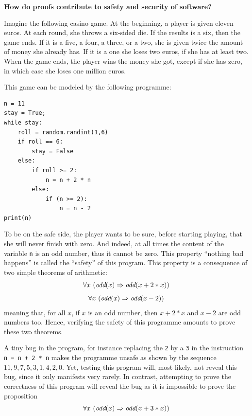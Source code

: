 \begin{shaded}
\vspace*{-0.5cm}
\begin{center}
{\bf \Large How do proofs contribute to safety and security of software?}
\end{center}

Imagine the following casino game. At the beginning, a player is given
eleven euros. At each round, she throws a six-sided die. If the
results is a six, then the game ends.  If it is a five, a four, a
three, or a two, she is given twice the amount of money she already
has. If it is a one she loses two euros, if she has at least two.
When the game ends, the player wins the money she got, except if she
has zero, in which case she loses one million euros.

This game can be modeled by the following programme:
\begin{center}
    \begin{minipage}{10cm}
\begin{verbatim}
n = 11
stay = True;
while stay:
    roll = random.randint(1,6)
    if roll == 6:
        stay = False
    else:
        if roll >= 2:
            n = n + 2 * n
        else:
            if (n >= 2):
                n = n - 2
print(n)
\end{verbatim}
    \end{minipage}
\end{center}

To be on the safe side, the player wants to be sure, before starting
playing, that she will never finish with zero.  And indeed, at all times
the content of the variable {\tt n} is an odd number,
thus it cannot be zero. This property ``nothing bad happens'' is
called the ``safety'' of this program. This property is a
consequence of two simple theorems of arithmetic:
$$\forall x~(\mbox{\it odd}(x) \Rightarrow \mbox{\it odd}(x + 2 * x))$$
$$\forall x~(\mbox{\it odd}(x) \Rightarrow \mbox{\it odd}(x - 2))$$
meaning that, for all $x$, if $x$ is an odd number, then $x+2*x$ and $x-2$ are odd numbers too.
Hence, verifying the safety of this programme
amounts to prove these two theorems.

A tiny bug in the program, for instance replacing the {\tt 2} by a
{\tt 3} in the instruction {\tt n = n + 2 * n} makes the programme unsafe
as shown by the sequence $11, 9, 7, 5, 3, 1, 4, 2, 0$. Yet, testing
this program will, most likely, not reveal this bug, since it only manifests
very rarely.  In contrast, attempting to prove the correctness of this
program will
reveal the bug as it is impossible to prove the proposition
$$\forall x~(\mbox{\it odd}(x) \Rightarrow \mbox{\it odd}(x + 3 * x))$$
\end{shaded}

